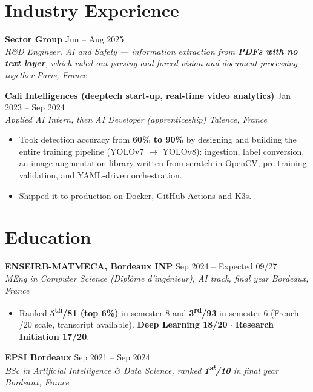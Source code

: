 \documentclass[10pt, letterpaper]{article}
\newcommand{\entry}[4]{%
  \noindent \textbf{#1} \hfill #2 \\
  \textit{#3} \hfill \textit{#4} \par
}
\begin{document}
\section{Industry Experience}

\entry{Sector Group}{Jun -- Aug 2025}{R\&D Engineer, AI and Safety --- information extraction from \textbf{PDFs with no text layer}, which ruled out parsing and forced vision and document processing together}{Paris, France}

\vspace{1pt}

\entry{Cali Intelligences (deeptech start-up, real-time video analytics)}{Jan 2023 -- Sep 2024}%
{Applied AI Intern, then AI Developer (apprenticeship)}{Talence, France}
\begin{itemize}
    \item Took detection accuracy from \textbf{60\% to 90\%} by designing and building the entire training pipeline (YOLOv7 $\to$ YOLOv8): ingestion, label conversion, an image augmentation library written from scratch in OpenCV, pre-training validation, and YAML-driven orchestration.
    \item Shipped it to production on Docker, GitHub Actions and K3s.
\end{itemize}

\section{Education}

\entry{ENSEIRB-MATMECA, Bordeaux INP}{Sep 2024 -- Expected 09/27}%
{MEng in Computer Science (\textit{Diplôme d'ingénieur}), AI track, final year}{Bordeaux, France}
\begin{itemize}
    \item Ranked \textbf{5\textsuperscript{th}/81 (top 6\%)} in semester 8 and \textbf{3\textsuperscript{rd}/93} in semester 6 (French /20 scale, transcript available). \textbf{Deep Learning 18/20} $\cdot$ \textbf{Research Initiation 17/20}.
\end{itemize}

\vspace{1pt}

\entry{EPSI Bordeaux}{Sep 2021 -- Sep 2024}%
{BSc in Artificial Intelligence \& Data Science, ranked \textbf{1\textsuperscript{st}/10} in final year}{Bordeaux, France}
\end{document}
